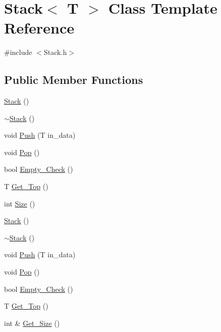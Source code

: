 \hypertarget{class_stack}{\section{Stack$<$ T $>$ Class Template Reference}
\label{class_stack}
}


{\ttfamily \#include $<$Stack.\-h$>$}

\subsection*{Public Member Functions}
\begin{DoxyCompactItemize}
\item 
\hyperlink{class_stack_aefee698059467258bbd79045aca62a63}{Stack} ()
\item 
\hyperlink{class_stack_a9e7a00875aefbdac560ab189b7bc61d1}{$\sim$\-Stack} ()
\item 
void \hyperlink{class_stack_a835205de9721bb1b6ba2e1f12c5ce7a4}{Push} (T in\-\_\-data)
\item 
void \hyperlink{class_stack_a197a49c3d95c29649cf35f756999c612}{Pop} ()
\item 
bool \hyperlink{class_stack_a384e9772465aeeb2f3bbe31a375d61cb}{Empty\-\_\-\-Check} ()
\item 
T \hyperlink{class_stack_a08d414492f1ea3b9181988af5383e792}{Get\-\_\-\-Top} ()
\item 
int \hyperlink{class_stack_a71b9623c81ddeb690c6fd0c7fb1d7bba}{Size} ()
\item 
\hyperlink{class_stack_aefee698059467258bbd79045aca62a63}{Stack} ()
\item 
\hyperlink{class_stack_a9e7a00875aefbdac560ab189b7bc61d1}{$\sim$\-Stack} ()
\item 
void \hyperlink{class_stack_a835205de9721bb1b6ba2e1f12c5ce7a4}{Push} (T in\-\_\-data)
\item 
void \hyperlink{class_stack_a197a49c3d95c29649cf35f756999c612}{Pop} ()
\item 
bool \hyperlink{class_stack_a384e9772465aeeb2f3bbe31a375d61cb}{Empty\-\_\-\-Check} ()
\item 
T \hyperlink{class_stack_a08d414492f1ea3b9181988af5383e792}{Get\-\_\-\-Top} ()
\item 
int \& \hyperlink{class_stack_a7aac9ba68fedcce029ecbd20b5a9a4eb}{Get\-\_\-\-Size} ()
\end{DoxyCompactItemize}


